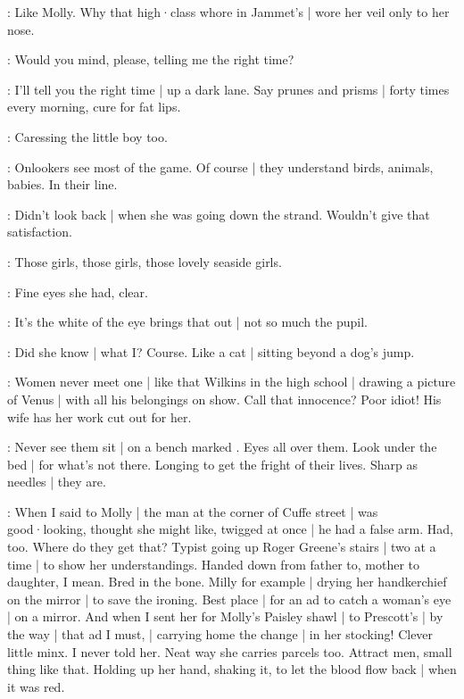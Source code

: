 \BloomHist:
Like Molly.
Why that high·class whore in Jammet's |
wore her veil
only to her nose.%

\BloomOther:
Would you mind,
please,
telling me the right time?

\BloomAbstract:
I'll tell you the right time |
up a dark lane.
Say prunes and prisms |
forty times every morning,
cure for fat lips.

\BloomCurrent:
Caressing the little boy too.

\BloomAbstract:
Onlookers see most of the game.
Of course |
they understand birds,
animals,
babies.
In their line.

\BloomCurrent:
Didn't look back |
when she was going down the strand.
Wouldn't give that satisfaction.

\BloomHist:
Those girls,
those girls,
those lovely seaside girls.

\BloomCurrent:
Fine eyes she had,
clear.

\BloomAbstract:
It's the white of the eye brings that out |
not so much the pupil.

\BloomCurrent:
Did she know |
what I?
Course.
Like a cat |
sitting beyond a dog's jump.

\BloomHist:
Women never meet one |
like that Wilkins in the high school |
drawing a picture of Venus |
with all his belongings on show.%
Call that innocence?
Poor idiot!
His wife has her work cut out for her.

\BloomAbstract:
Never see them sit |
on a bench marked .
Eyes all over them.
Look under the bed |
for what's not there.
Longing to get the fright of their lives.
Sharp as needles |
they are.

\BloomHist:
When I said to Molly |
the man at the corner of Cuffe street |
was good·looking,
thought she might like,
twigged at once |
he had a false arm.
Had,
too.
Where do they get that?
Typist going up Roger Greene's stairs |
two at a time |
to show her understandings.
Handed down from father to,
mother to daughter,
I mean.
Bred in the bone.
Milly for example |
drying her handkerchief
on the mirror |
to save the ironing.
Best place |
for an ad to catch a woman's eye |
on a mirror.%
And when I sent her
for Molly's Paisley shawl |
to Prescott's |
by the way |
that ad I must, |
carrying home the change |
in her stocking!
Clever little minx.
I never told her.
Neat way she carries parcels too.
Attract men,
small thing like that.
Holding up her hand,
shaking it,
to let the blood flow back |
when it was red.


